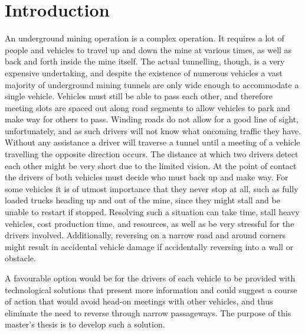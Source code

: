 \documentclass{article}
\begin{document}
		\setcounter{secnumdepth}{3}
		\setcounter{tocdepth}{3}
		\tableofcontents
		\newpage

    \section{Introduction}
		An underground mining operation is a complex operation. It requires a lot of people and vehicles to travel up and down the mine at various times, as well as back and forth inside the mine itself. The actual tunnelling, though, is a very expensive undertaking, and despite the existence of numerous vehicles a vast majority of underground mining tunnels are only wide enough to accommodate a single vehicle. Vehicles must still be able to pass each other, and therefore meeting slots are spaced out along road segments to allow vehicles to park and make way for others to pass. Winding roads do not allow for a good line of sight, unfortunately, and as such drivers will not know what oncoming traffic they have. Without any assistance a driver will traverse a tunnel until a meeting of a vehicle travelling the opposite direction occurs. The distance at which two drivers detect each other might be very short due to the limited vision. At the point of contact the drivers of both vehicles must decide who must back up and make way. For some vehicles it is of utmost importance that they never stop at all, such as fully loaded trucks heading up and out of the mine, since they might stall and be unable to restart if stopped. Resolving such a situation can take time, stall heavy vehicles, cost production time, and resources, as well as be very stressful for the drivers involved. Additionally, reversing on a narrow road and around corners might result in accidental vehicle damage if accidentally reversing into a wall or obstacle.

		A favourable option would be for the drivers of each vehicle to be provided with technological solutions that present more information and could suggest a course of action that would avoid head-on meetings with other vehicles, and thus eliminate the need to reverse through narrow passageways. The purpose of this master's thesis is to develop such a solution.
\end{document}
